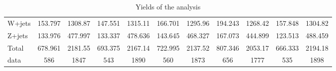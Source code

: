 \documentclass[10pt]{article}
\begin{document}
\begin{table}[htbp]
\begin{center}
\begin{tabular}{|l|S|S|S|S|S|S|S|S|S|S|}
  W+jets   & 153.797  & 1308.87  & 147.551  & 1315.11  & 166.701  & 1295.96  & 194.243  & 1268.42  & 157.848  & 1304.82  \\ 
  Z+jets   & 133.976  & 477.997  & 133.337  & 478.636  & 143.645  & 468.327  & 167.073  & 444.899  & 123.513  & 488.459  \\ 
\hline 
  Total  & 678.961  & 2181.55  & 693.375  & 2167.14  & 722.995  & 2137.52  & 807.346  & 2053.17  & 666.333  & 2194.18  \\ 
\hline 
  data   & 586 & 1847 & 543 & 1890 & 560 & 1873 & 656 & 1777 & 535 & 1898 \\ 
\hline 
\end{tabular} 
\caption{Yields of the analysis} 
\end{center} 
\end{table} 
\end{document}
